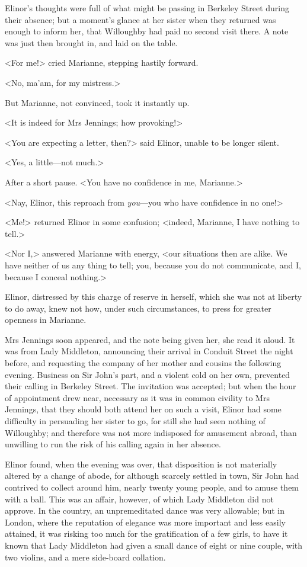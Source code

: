 Elinor's thoughts were full of what might be passing in Berkeley Street during their absence; but a moment's glance at her sister when they returned was enough to inform her, that Willoughby had paid no second visit there. A note was just then brought in, and laid on the table.

<For me!> cried Marianne, stepping hastily forward.

<No, ma'am, for my mistress.>

But Marianne, not convinced, took it instantly up.

<It is indeed for Mrs Jennings; how provoking!>

<You are expecting a letter, then?> said Elinor, unable to be longer silent.

<Yes, a little—not much.>

After a short pause. <You have no confidence in me, Marianne.>

<Nay, Elinor, this reproach from \textit{you}—you who have confidence in no one!>

<Me!> returned Elinor in some confusion; <indeed, Marianne, I have nothing to tell.>

<Nor I,> answered Marianne with energy, <our situations then are alike. We have neither of us any thing to tell; you, because you do not communicate, and I, because I conceal nothing.>

Elinor, distressed by this charge of reserve in herself, which she was not at liberty to do away, knew not how, under such circumstances, to press for greater openness in Marianne.

Mrs Jennings soon appeared, and the note being given her, she read it aloud. It was from Lady Middleton, announcing their arrival in Conduit Street the night before, and requesting the company of her mother and cousins the following evening. Business on Sir John's part, and a violent cold on her own, prevented their calling in Berkeley Street. The invitation was accepted; but when the hour of appointment drew near, necessary as it was in common civility to Mrs Jennings, that they should both attend her on such a visit, Elinor had some difficulty in persuading her sister to go, for still she had seen nothing of Willoughby; and therefore was not more indisposed for amusement abroad, than unwilling to run the risk of his calling again in her absence.

Elinor found, when the evening was over, that disposition is not materially altered by a change of abode, for although scarcely settled in town, Sir John had contrived to collect around him, nearly twenty young people, and to amuse them with a ball. This was an affair, however, of which Lady Middleton did not approve. In the country, an unpremeditated dance was very allowable; but in London, where the reputation of elegance was more important and less easily attained, it was risking too much for the gratification of a few girls, to have it known that Lady Middleton had given a small dance of eight or nine couple, with two violins, and a mere side-board collation.

